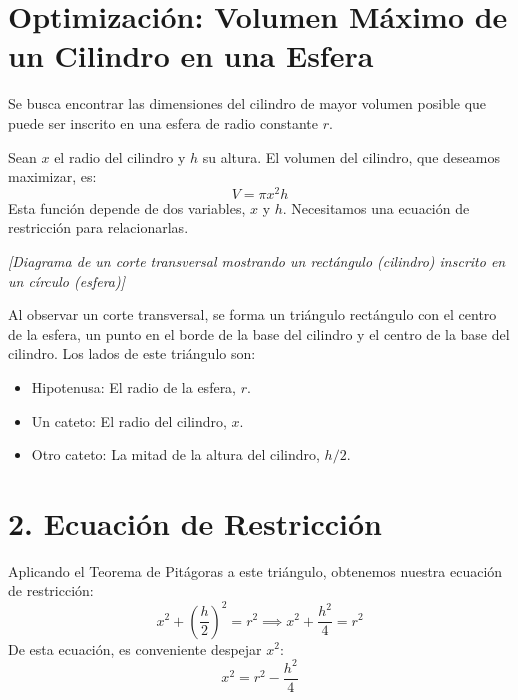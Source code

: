 \documentclass[12pt, letterpaper]{article}
\begin{document}
\section*{Optimización: Volumen Máximo de un Cilindro en una Esfera}

Se busca encontrar las dimensiones del cilindro de mayor volumen posible que puede ser inscrito en una esfera de radio constante $r$.

Sean $x$ el radio del cilindro y $h$ su altura. El volumen del cilindro, que deseamos maximizar, es:
$$ V = \pi x^2 h $$
Esta función depende de dos variables, $x$ y $h$. Necesitamos una ecuación de restricción para relacionarlas.

\begin{center}
    \textit{[Diagrama de un corte transversal mostrando un rectángulo (cilindro) inscrito en un círculo (esfera)]}
\end{center}

Al observar un corte transversal, se forma un triángulo rectángulo con el centro de la esfera, un punto en el borde de la base del cilindro y el centro de la base del cilindro. Los lados de este triángulo son:
\begin{itemize}
    \item Hipotenusa: El radio de la esfera, $r$.
    \item Un cateto: El radio del cilindro, $x$.
    \item Otro cateto: La mitad de la altura del cilindro, $h/2$.
\end{itemize}

\section*{2. Ecuación de Restricción}
Aplicando el Teorema de Pitágoras a este triángulo, obtenemos nuestra ecuación de restricción:
$$ x^2 + \left(\frac{h}{2}\right)^2 = r^2 \implies x^2 + \frac{h^2}{4} = r^2 $$
De esta ecuación, es conveniente despejar $x^2$:
$$ x^2 = r^2 - \frac{h^2}{4} $$
\end{document}
